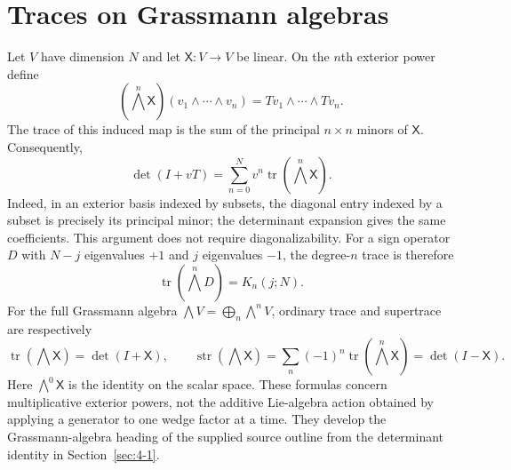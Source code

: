 \section{Traces on Grassmann algebras}
\label{sec:4-2}
Let $V$ have dimension $N$ and let $\mathsf X:V\to V$ be linear. On the $n$th exterior power define
\[
(\bigwedge^n \mathsf X)(v_1\wedge\cdots\wedge v_n)
=Tv_1\wedge\cdots\wedge Tv_n.
\]
The trace of this induced map is the sum of the principal $n\times n$ minors of $\mathsf X$. Consequently,
\begin{equation}\label{eq:exterior-trace-determinant}
\det(I+vT)=\sum_{n=0}^N v^n\operatorname{tr}(\bigwedge^n \mathsf X).
\end{equation}
Indeed, in an exterior basis indexed by subsets, the diagonal entry indexed by a subset is precisely its principal minor; the determinant expansion gives the same coefficients. This argument does not require diagonalizability.
For a sign operator $D$ with $N-j$ eigenvalues $+1$ and $j$ eigenvalues $-1$, the degree-$n$ trace is therefore
\[
\operatorname{tr}(\bigwedge^n D)=K_n(j;N).
\]
For the full Grassmann algebra $\bigwedge V=\bigoplus_n\bigwedge^n V$, ordinary trace and supertrace are respectively
\[
\operatorname{tr}(\bigwedge \mathsf X)=\det(I+\mathsf X),\qquad
\operatorname{str}(\bigwedge \mathsf X)=\sum_n(-1)^n\operatorname{tr}(\bigwedge^n \mathsf X)=\det(I-\mathsf X).
\]
Here $\bigwedge^0\mathsf X$ is the identity on the scalar space. These formulas concern multiplicative exterior powers, not the additive Lie-algebra action obtained by applying a generator to one wedge factor at a time. They develop the Grassmann-algebra heading of the supplied source outline from the determinant identity in Section~\ref{sec:4-1}.

